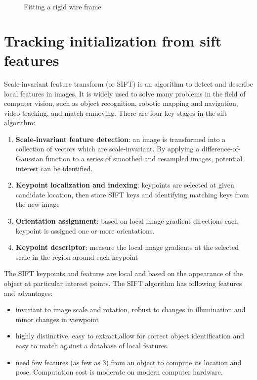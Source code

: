 \begin{figure}
\begin{minipage}[t]{0.45\linewidth}
    \label{subfig:iteration 3}
  \end{minipage} 
  \begin{minipage}[t]{0.45\linewidth} 
    \centering 
  \end{minipage} 
\caption{Fitting a rigid wire frame}
\end{figure}


\section{Tracking initialization from sift features}
\label{sift_init}
Scale-invariant feature transform (or SIFT) is an algorithm to detect
and describe local features in images.  It is widely used to solve
many problems in the field of computer vision, such as object
recognition, robotic mapping and navigation, video tracking, and match
enmoving. There are four key stages in the sift algorithm\cite{lowe2004distinctive}:
\begin{enumerate}
\item \textbf{Scale-invariant feature detection}: an image is transformed into
  a collection of vectors which are scale-invariant. By applying a difference-of-Gaussian
function to a series of smoothed and resampled images, potential
interest can be identified.
\item \textbf{Keypoint localization and indexing}: keypoints are selected at given
  candidate location, then store SIFT keys and identifying matching keys from the new image
\item \textbf{Orientation assignment}:  based on local image gradient
  directions each keypoint is assigned one or more orientations.
\item \textbf{Keypoint descriptor}: measure the local image gradients
  at the selected scale in the region around each keypoint
\end{enumerate}


The SIFT keypoints and features are local and based on the appearance
of the object at particular interest points. The SIFT algorithm has following
features and advantages:
\begin{itemize}
\item invariant to image scale and rotation, robust to changes in
  illumination and minor changes in viewpoint
\item highly distinctive, easy to extract,allow for correct object
  identification and easy to match against a database of local
  features. 
\item need few features (as few as 3) from an object to compute its location
  and pose. Computation cost is moderate on modern computer hardware.
\end{itemize}

